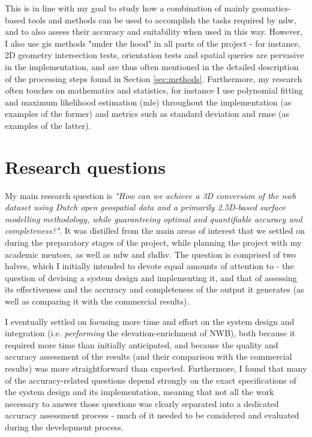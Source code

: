 This is in line with my goal to study how a combination of mainly geomatics-based tools and methods can be used to accomplish the tasks required by \ac{ndw}, and to also assess their accuracy and suitability when used in this way. However, I also use \ac{gis} methods "under the hood" in all parts of the project - for instance, 2D geometry intersection tests, orientation tests and spatial queries are pervasive in the implementation, and are thus often mentioned in the detailed description of the processing steps found in Section \ref{sec:methods}. Furthermore, my research often touches on mathematics and statistics, for instance I use polynomial fitting and maximum likelihood estimation (\ac{mle}) throughout the implementation (as examples of the former) and metrics such as standard deviation and \ac{rmse} (as examples of the latter).

\section{Research questions}
\label{sec:rq}

My main research question is \textit{"How can we achieve a 3D conversion of the \ac{nwb} dataset using Dutch open geospatial data and a primarily 2.5D-based surface modelling methodology, while guaranteeing optimal and quantifiable accuracy and completeness?"}. It was distilled from the main areas of interest that we settled on during the preparatory stages of the project, while planning the project with my academic mentors, as well as \ac{ndw} and \ac{rhdhv}. The question is comprised of two halves, which I initially intended to devote equal amounts of attention to - the question of devising a system design and implementing it, and that of assessing its effectiveness and the accuracy and completeness of the output it generates (as well as comparing it with the commercial results).

I eventually settled on focusing more time and effort on the system design and integration (i.e. \textit{performing} the elevation-enrichment of NWB), both because it required more time than initially anticipated, and because the quality and accuracy assessment of the results (and their comparison with the commercial results) was more straightforward than expected. Furthermore, I found that many of the accuracy-related questions depend strongly on the exact specifications of the system design and its implementation, meaning that not all the work necessary to answer those questions was clearly separated into a dedicated accuracy assessment process - much of it needed to be considered and evaluated during the development process.

